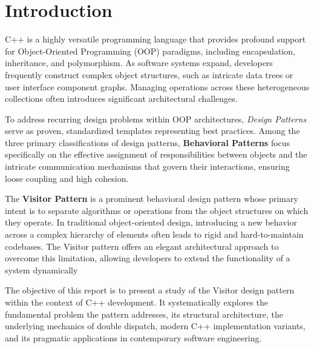\section{Introduction}
\label{sec:introduction}

C++ is a highly versatile programming language that provides profound support for Object-Oriented Programming (OOP) paradigms, including encapsulation, inheritance, and polymorphism. As software systems expand, developers frequently construct complex object structures, such as intricate data trees or user interface component graphs. Managing operations across these heterogeneous collections often introduces significant architectural challenges.

To address recurring design problems within OOP architectures, \textit{Design Patterns} serve as proven, standardized templates representing best practices. Among the three primary classifications of design patterns, \textbf{Behavioral Patterns} focus specifically on the effective assignment of responsibilities between objects and the intricate communication mechanisms that govern their interactions, ensuring loose coupling and high cohesion.

The \textbf{Visitor Pattern} is a prominent behavioral design pattern whose primary intent is to separate algorithms or operations from the object structures on which they operate. In traditional object-oriented design, introducing a new behavior across a complex hierarchy of elements often leads to rigid and hard-to-maintain codebases. The Visitor pattern offers an elegant architectural approach to overcome this limitation, allowing developers to extend the functionality of a system dynamically

The objective of this report is to present a study of the Visitor design pattern within the context of C++ development. It systematically explores the fundamental problem the pattern addresses, its structural architecture, the underlying mechanics of double dispatch, modern C++ implementation variants, and its pragmatic applications in contemporary software engineering.
